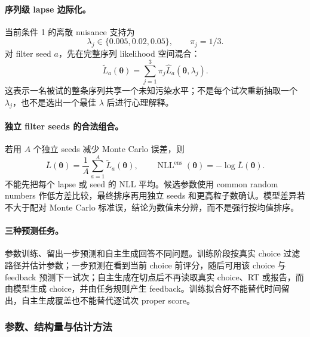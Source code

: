 \paragraph{序列级 lapse 边际化。}
当前条件 1 的离散 nuisance 支持为
\begin{equation}
    \lambda_j\in\{0.005,0.02,0.05\},
    \qquad \pi_j=1/3.
\end{equation}
对 filter seed $a$，先在完整序列 likelihood 空间混合：
\begin{equation}
    \widetilde L_a(\boldsymbol\theta)
    =\sum_{j=1}^{3}\pi_j
      \widehat L_a(\boldsymbol\theta,\lambda_j).
    \label{eq:model0805-lapse-marginal}
\end{equation}
这表示一名被试的整条序列共享一个未知污染水平；不是每个试次重新抽取一个 $\lambda_j$，也不是选出一个最佳 $\lambda$ 后进行心理解释。

\paragraph{独立 filter seeds 的合法组合。}
若用 $A$ 个独立 seeds 减少 Monte Carlo 误差，则
\begin{equation}
    \overline L(\boldsymbol\theta)
    =\frac1A\sum_{a=1}^{A}\widetilde L_a(\boldsymbol\theta),
    \qquad
    \operatorname{NLL}^{\mathrm{ens}}(\boldsymbol\theta)
    =-\log\overline L(\boldsymbol\theta).
    \label{eq:model0805-seed-ensemble}
\end{equation}
不能先把每个 lapse 或 seed 的 NLL 平均。候选参数使用 common random numbers 作低方差比较，最终排序再用独立 seeds 和更高粒子数确认。模型差异若不大于配对 Monte Carlo 标准误，结论为数值未分辨，而不是强行按均值排序。

\paragraph{三种预测任务。}
参数训练、留出一步预测和自主生成回答不同问题。训练阶段按真实 choice 过滤路径并估计参数；一步预测在看到当前 choice 前评分，随后可用该 choice 与 feedback 预测下一试次；自主生成在切点后不再读取真实 choice、RT 或报告，而由模型生成 choice，并由任务规则产生 feedback。训练拟合好不能替代时间留出，自主生成覆盖也不能替代逐试次 proper score。


\subsubsection{参数、结构量与估计方法}

